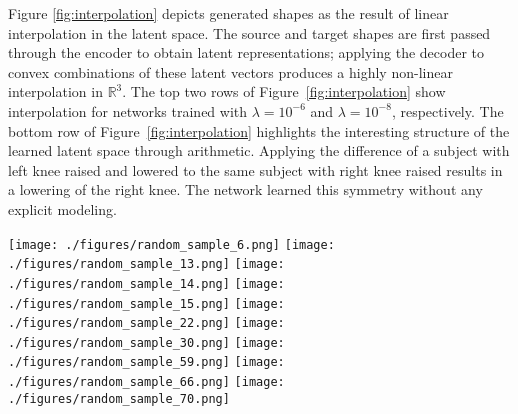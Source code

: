 \documentclass[10pt,twocolumn,letterpaper]{article}
\begin{document}
Figure \ref{fig:interpolation} depicts generated shapes as the result of linear interpolation in the latent space. The source and target shapes are first passed through the encoder to obtain latent representations; applying the decoder to convex combinations of these latent vectors produces a highly non-linear interpolation in $\mathbb{R}^3$. The top two rows of Figure~\ref{fig:interpolation} show interpolation for networks trained with $\lambda=10^{-6}$ and $\lambda=10^{-8}$, respectively. The bottom row of Figure~\ref{fig:interpolation} highlights the interesting structure of the learned latent space through arithmetic. Applying the difference of a subject with left knee raised and lowered to the same subject with right knee raised results in a lowering of the right knee. The network learned this symmetry without any explicit modeling.

\centering
\texttt{[image: ./figures/random\_sample\_6.png]}
\texttt{[image: ./figures/random\_sample\_13.png]}
\texttt{[image: ./figures/random\_sample\_14.png]}
\texttt{[image: ./figures/random\_sample\_15.png]}
\texttt{[image: ./figures/random\_sample\_22.png]}
\texttt{[image: ./figures/random\_sample\_30.png]}
\texttt{[image: ./figures/random\_sample\_59.png]}
\texttt{[image: ./figures/random\_sample\_66.png]}
\texttt{[image: ./figures/random\_sample\_70.png]}
\end{document}
